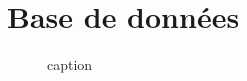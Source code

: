 \section{Base de données}

    
    \begin{figure}[H]
        \centering
        \caption{caption}
        \label{fig:outil_annotation}
    \end{figure}

